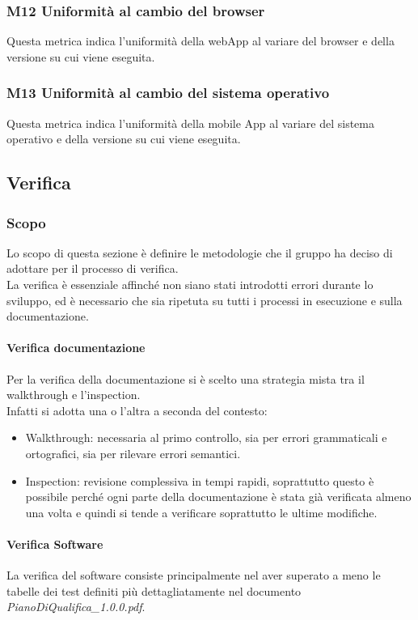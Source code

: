 \subsubsection{M12 Uniformità al cambio del browser}
Questa metrica indica l'uniformità della webApp al variare del browser e della versione su cui viene eseguita.
\subsubsection{M13 Uniformità al cambio del sistema operativo}
Questa metrica indica l'uniformità della mobile App al variare del sistema operativo e della versione su cui viene eseguita.

\subsection{Verifica}
\subsubsection{Scopo}

Lo scopo di questa sezione è definire le metodologie che il gruppo ha deciso di adottare per il processo di verifica.\\
La verifica è essenziale affinché non siano stati introdotti errori durante lo sviluppo, ed è necessario che sia ripetuta su tutti i processi in esecuzione e sulla documentazione.

\paragraph{Verifica documentazione}
Per la verifica della documentazione si è scelto una strategia mista tra il walkthrough e l'inspection.\\
Infatti si adotta una o l'altra a seconda del contesto:
\begin{itemize}
    \item Walkthrough: necessaria al primo controllo, sia per errori grammaticali e ortografici, sia per rilevare errori semantici.
    \item Inspection: revisione complessiva in tempi rapidi, soprattutto questo è possibile perché ogni parte della documentazione è stata già verificata almeno una volta e quindi si tende a verificare soprattutto le ultime modifiche.
\end{itemize}
\paragraph{Verifica Software}
La verifica del software consiste principalmente nel aver superato a meno le tabelle dei test definiti più dettagliatamente nel documento \textit{PianoDiQualifica\_1.0.0.pdf}.
